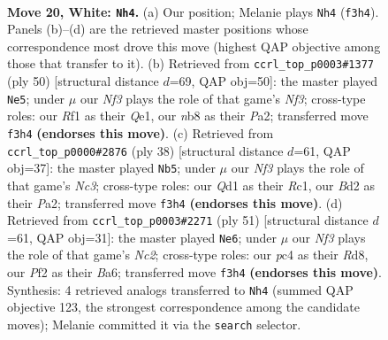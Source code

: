 \documentclass[11pt]{article}
\begin{document}
\clearpage

\begin{figure}[p]\centering
\begin{subfigure}{0.46\textwidth}\centering
\resizebox{\linewidth}{!}{%
\newchessgame
\chessboard[
  setfen={rn2k1r1/p3b3/b5p1/3q1p2/1Pp5/5NP1/P2BPP2/R2Q1RK1 w q - 0 20},
  showmover=false,
  pgfstyle=straightmove, color=movearrow, markmove={f3-h4}
]}
\caption{}
\end{subfigure}\hfill
\begin{subfigure}{0.46\textwidth}\centering
\resizebox{\linewidth}{!}{%
\newchessgame
\chessboard[
  setfen={2r1r1k1/p4pp1/1p3q2/1bnP3p/8/4RN1P/P1BR1PP1/4Q1K1 w - - 4 26},
  showmover=false,
  pgfstyle=straightmove, color=movearrow, markmove={f3-e5}
]}
\caption{}
\end{subfigure}
\\[4pt]
\begin{subfigure}{0.46\textwidth}\centering
\resizebox{\linewidth}{!}{%
\newchessgame
\chessboard[
  setfen={1k1r3r/pp3p2/4b2p/q1b3p1/8/2NB1PP1/PP2QP2/2R2RK1 w - - 5 20},
  showmover=false,
  pgfstyle=straightmove, color=movearrow, markmove={c3-b5}
]}
\caption{}
\end{subfigure}\hfill
\begin{subfigure}{0.46\textwidth}\centering
\resizebox{\linewidth}{!}{%
\newchessgame
\chessboard[
  setfen={1r1r2k1/2n1qp2/b5p1/3pP3/Np1P4/6P1/1PQ3B1/3RR1K1 b - - 0 26},
  showmover=false,
  pgfstyle=straightmove, color=movearrow, markmove={c7-e6}
]}
\caption{}
\end{subfigure}
\caption{\textbf{Move 20, White: \texttt{Nh4}.} (a) Our position; Melanie plays \texttt{Nh4} (\texttt{f3h4}). Panels (b)--(d) are the retrieved master positions whose correspondence most drove this move (highest QAP objective among those that transfer to it). (b) Retrieved from \texttt{ccrl\_top\_p0003\#1377} (ply 50) [structural distance $d$=69, QAP obj=50]: the master played \texttt{Ne5}; under $\mu$ our \emph{Nf3} plays the role of that game's \emph{Nf3}; cross-type roles: our \emph{R}f1 as their \emph{Q}e1, our \emph{n}b8 as their \emph{P}a2; transferred move \texttt{f3h4} \textbf{(endorses this move)}. (c) Retrieved from \texttt{ccrl\_top\_p0000\#2876} (ply 38) [structural distance $d$=61, QAP obj=37]: the master played \texttt{Nb5}; under $\mu$ our \emph{Nf3} plays the role of that game's \emph{Nc3}; cross-type roles: our \emph{Q}d1 as their \emph{R}c1, our \emph{B}d2 as their \emph{P}a2; transferred move \texttt{f3h4} \textbf{(endorses this move)}. (d) Retrieved from \texttt{ccrl\_top\_p0003\#2271} (ply 51) [structural distance $d$=61, QAP obj=31]: the master played \texttt{Ne6}; under $\mu$ our \emph{Nf3} plays the role of that game's \emph{Nc2}; cross-type roles: our \emph{p}c4 as their \emph{R}d8, our \emph{P}f2 as their \emph{B}a6; transferred move \texttt{f3h4} \textbf{(endorses this move)}. Synthesis: 4 retrieved analogs transferred to \texttt{Nh4} (summed QAP objective 123, the strongest correspondence among the candidate moves); Melanie committed it via the \texttt{search} selector.}
\label{fig:thought-m38}
\end{figure}
\end{document}
